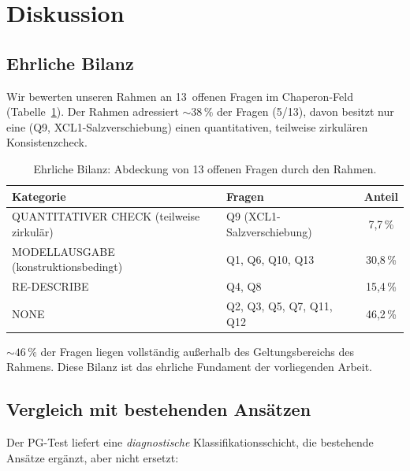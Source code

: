 \documentclass[12pt,a4paper]{article}
\begin{document}
\section{Diskussion}
\label{sec:discussion}

\subsection{Ehrliche Bilanz}

Wir bewerten unseren Rahmen an 13~offenen Fragen im Chaperon-Feld
(Tabelle~\ref{tab:balance}). Der Rahmen adressiert ${\sim}38\,\%$ der
Fragen (5/13), davon besitzt nur eine (Q9, XCL1-Salzverschiebung) einen
quantitativen, teilweise zirkulären Konsistenzcheck.

\begin{table}[!htbp]
\centering
\caption{Ehrliche Bilanz: Abdeckung von 13 offenen Fragen durch den
Rahmen.}
\label{tab:balance}
\begin{tabular}{@{}llc@{}}
\toprule
Kategorie & Fragen & Anteil \\
\midrule
QUANTITATIVER CHECK (teilweise zirkulär) & Q9 (XCL1-Salzverschiebung) & 7{,}7\,\% \\
MODELLAUSGABE (konstruktionsbedingt) & Q1, Q6, Q10, Q13 & 30{,}8\,\% \\
RE-DESCRIBE & Q4, Q8 & 15{,}4\,\% \\
NONE & Q2, Q3, Q5, Q7, Q11, Q12 & 46{,}2\,\% \\
\bottomrule
\end{tabular}
\end{table}

${\sim}46\,\%$ der Fragen liegen vollständig außerhalb des Geltungsbereichs
des Rahmens. Diese Bilanz ist das ehrliche Fundament der vorliegenden Arbeit.

\subsection{Vergleich mit bestehenden Ansätzen}

Der PG-Test liefert eine \emph{diagnostische} Klassifikationsschicht, die
bestehende Ansätze ergänzt, aber nicht ersetzt:
\end{document}
